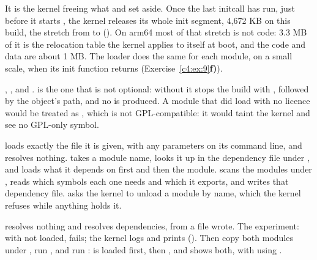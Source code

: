  It is the kernel freeing what  and  set aside. Once the last
initcall has run, just before it starts , the kernel releases its whole init segment,
4,672 KB on this build, the stretch from  to 
(). On arm64 most of that stretch is not  code: 3.3 MB of it is the
relocation table the kernel applies to itself at boot, and the  code and data are about
1 MB. The loader does the same for each module, on a small scale, when its init function returns
(Exercise~\ref{c4:ex:9}\textbf{f)}).

 , ,  and
.  is the one that is not optional: without it
 stops the build with , followed by
the object's path, and no  is produced. A module that did load with no licence would be
treated as , which is not GPL-compatible: it would taint the kernel and see no
GPL-only symbol.


  loads exactly the file it is given, with any parameters on its command
line, and resolves nothing.  takes a module name, looks it up in the dependency file
under , and loads what it depends on first and then the module.
 scans the modules under , reads which symbols each one
needs and which it exports, and writes that dependency file.  asks the kernel to unload
a module by name, which the kernel refuses while anything holds it.

  resolves nothing and  resolves dependencies, from a file
 wrote. The experiment: with  not loaded, 
fails; the kernel logs  and  prints
(). Then copy both modules under , run
, and run :  is loaded first, then
, and  shows both, with  using .

